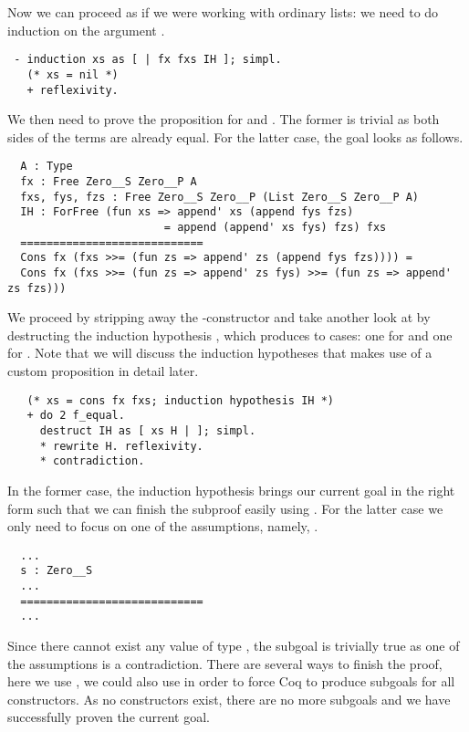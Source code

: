 Now we can proceed as if we were working with ordinary lists: we need to do induction on the  argument .

\begin{verbatim}
 - induction xs as [ | fx fxs IH ]; simpl.
   (* xs = nil *)
   + reflexivity.
\end{verbatim}
 
We then need to prove the proposition for  and .
The former is trivial as both sides of the terms are already equal.
For the latter case, the goal looks as follows.

\begin{verbatim}
  A : Type
  fx : Free Zero__S Zero__P A
  fxs, fys, fzs : Free Zero__S Zero__P (List Zero__S Zero__P A)
  IH : ForFree (fun xs => append' xs (append fys fzs)
                        = append (append' xs fys) fzs) fxs
  ============================
  Cons fx (fxs >>= (fun zs => append' zs (append fys fzs)))) =
  Cons fx (fxs >>= (fun zs => append' zs fys) >>= (fun zs => append' zs fzs)))
\end{verbatim}

We proceed by stripping away the -constructor and take another look at  by destructing the induction hypothesis , which produces to cases: one for  and one for .
Note that we will discuss the induction hypotheses  that makes use of a custom proposition  in detail later.

\begin{verbatim}
   (* xs = cons fx fxs; induction hypothesis IH *)
   + do 2 f_equal.
     destruct IH as [ xs H | ]; simpl.
     * rewrite H. reflexivity.
     * contradiction.
\end{verbatim}

In the former case, the induction hypothesis brings our current goal in the right form such that we can finish the subproof easily using .
For the latter case we only need to focus on one of the assumptions, namely, .

\begin{verbatim}
  ...
  s : Zero__S
  ...
  ============================
  ...
\end{verbatim}

Since there cannot exist any value of type , the subgoal is trivially true as one of the assumptions is a contradiction.
There are several ways to finish the proof, here we use , we could also use  in order to force Coq to produce subgoals for all constructors.
As no constructors exist, there are no more subgoals and we have successfully proven the current goal.

